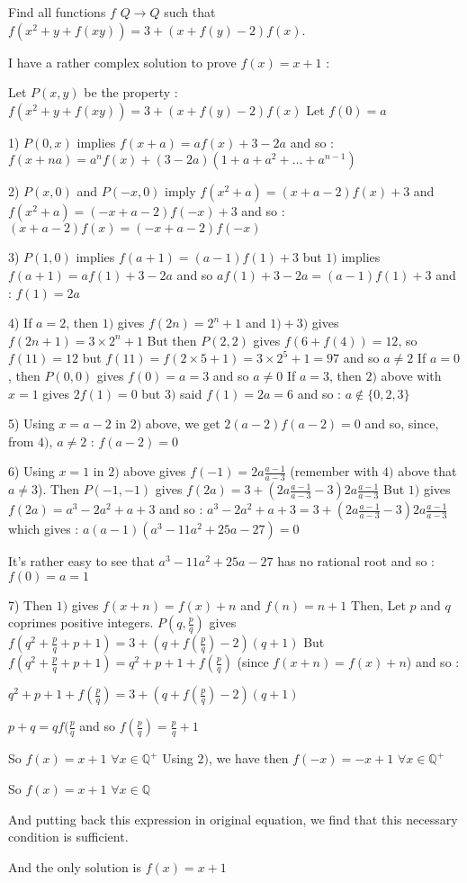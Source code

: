 \begin{mysolution}
	\begin{tcolorbox}Find all functions $ f$ $ Q\to Q$  such that $ f(x^{2} + y + f(xy)) = 3 + (x + f(y) - 2)f(x)$.\end{tcolorbox}

I have a rather complex solution to prove $ f(x)=x+1$ :

Let $ P(x,y)$ be the property : $ f(x^{2} + y + f(xy)) = 3 + (x + f(y) - 2)f(x)$
Let $ f(0)=a$

1) $ P(0,x)$ implies $ f(x+a)=af(x)+3-2a$ and so :
$ \boxed{f(x+na)=a^nf(x)+(3-2a)(1+a+a^2+\ldots+a^{n-1})}$

2) $ P(x,0)$ and $ P(-x,0)$ imply $ f(x^2+a)=(x+a-2)f(x)+3$ and $ f(x^2+a)=(-x+a-2)f(-x)+3$ and so :
$ \boxed{(x+a-2)f(x)=(-x+a-2)f(-x)}$

3) $ P(1,0)$ implies $ f(a+1)=(a-1)f(1)+3$ but $ 1)$ implies $ f(a+1)=af(1)+3-2a$ and so $ af(1)+3-2a=(a-1)f(1)+3$ and :
$ \boxed{f(1)=2a}$

4) If $ a=2$, then $ 1)$ gives $ f(2n)=2^n+1$ and $ 1)+3)$ gives $ f(2n+1)=3\times 2^n+1$
But then $ P(2,2)$ gives $ f(6+f(4))=12$, so $ f(11)=12$ but $ f(11)=f(2\times 5+1)=3\times 2^5+1=97$ and so $ a\neq 2$
If $ a=0$, then $ P(0,0)$ gives $ f(0)=a=3$ and so $ a\neq 0$
If $ a=3$, then $ 2)$ above with $ x=1$ gives $ 2f(1)=0$ but $ 3)$ said $ f(1)=2a=6$ and so :
$ \boxed{a\notin \{0,2,3\}}$

5) Using $ x=a-2$ in $ 2)$ above, we get $ 2(a-2)f(a-2)=0$ and so, since, from $ 4)$, $ a\neq 2$ :
$ \boxed{f(a-2)=0}$

6) Using $ x=1$ in $ 2)$ above gives $ f(-1)=2a\frac{a-1}{a-3}$ (remember with $ 4)$ above that $ a\neq 3$).
Then $ P(-1,-1)$ gives $ f(2a)=3 + (2a\frac{a-1}{a-3} - 3)2a\frac{a-1}{a-3}$
But $ 1)$ gives $ f(2a)=a^3-2a^2+a+3$ and so :
$ a^3-2a^2+a+3=3 + (2a\frac{a-1}{a-3} - 3)2a\frac{a-1}{a-3}$ which gives :
$ a(a-1)(a^3-11a^2+25a-27)= 0$

It's rather easy to see that $ a^3-11a^2+25a-27$ has no rational root and so :
$ \boxed{f(0)=a=1}$

7) Then $ 1)$ gives $ f(x+n)=f(x)+n$ and $ f(n)=n+1$
Then, Let $ p$ and $ q$ coprimes positive integers.
$ P(q,\frac{p}{q})$ gives $ f(q^2+\frac{p}{q}+p+1)=3 + (q + f(\frac{p}{q}) - 2)(q+1)$
But $ f(q^2+\frac{p}{q}+p+1)=q^2+p+1+f(\frac{p}{q})$ (since $ f(x+n)=f(x)+n$) and so :

$ q^2+p+1+f(\frac{p}{q})=3 + (q + f(\frac{p}{q}) - 2)(q+1)$

$ p+q=qf(\frac{p}{q}$ and so $ f(\frac{p}{q})=\frac{p}{q}+1$

So $ f(x)=x+1$ $ \forall x\in\mathbb{Q}^{+}$
Using $ 2)$, we have then $ f(-x)=-x+1$ $ \forall x\in\mathbb{Q}^{+}$

So $ f(x)=x+1$ $ \forall x\in\mathbb{Q}$

And putting back this expression in original equation, we find that this necessary condition is sufficient.

And the only solution is $ \boxed{f(x)=x+1}$
\end{mysolution}




